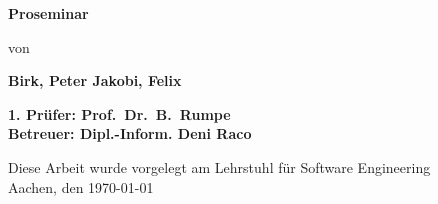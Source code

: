\begin{titlepage}
\begin{flushleft}
{    {\Large \textbf{Proseminar}\\}
        \vspace{3em}

        {\large von\\} %

    {\LARGE \textbf{Birk, Peter     Jakobi, Felix}\\}
    \vspace{3em}

    {\Large \textbf{1. Prüfer: Prof.\ Dr.\ B.\ Rumpe}\\}
    \vspace{1em}
    {\Large \textbf{Betreuer: Dipl.-Inform. Deni Raco}\\}
    \vspace{7em}

    {\large Diese Arbeit wurde vorgelegt am Lehrstuhl für Software Engineering \\}
    \vspace{1em}
        {\large Aachen, den \today\\}
  }
\end{flushleft}

\end{titlepage}





